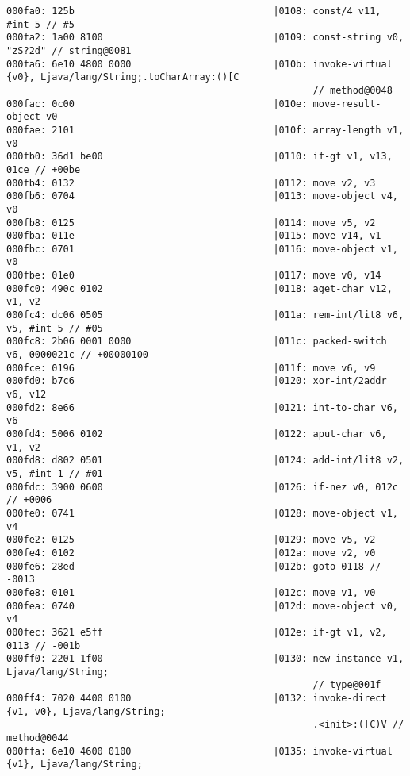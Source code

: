 \begin{lstlisting}
000fa0: 125b                                   |0108: const/4 v11, #int 5 // #5
000fa2: 1a00 8100                              |0109: const-string v0, "zS?2d" // string@0081
000fa6: 6e10 4800 0000                         |010b: invoke-virtual {v0}, Ljava/lang/String;.toCharArray:()[C
                                                      // method@0048
000fac: 0c00                                   |010e: move-result-object v0
000fae: 2101                                   |010f: array-length v1, v0
000fb0: 36d1 be00                              |0110: if-gt v1, v13, 01ce // +00be
000fb4: 0132                                   |0112: move v2, v3
000fb6: 0704                                   |0113: move-object v4, v0
000fb8: 0125                                   |0114: move v5, v2
000fba: 011e                                   |0115: move v14, v1
000fbc: 0701                                   |0116: move-object v1, v0
000fbe: 01e0                                   |0117: move v0, v14
000fc0: 490c 0102                              |0118: aget-char v12, v1, v2
000fc4: dc06 0505                              |011a: rem-int/lit8 v6, v5, #int 5 // #05
000fc8: 2b06 0001 0000                         |011c: packed-switch v6, 0000021c // +00000100
000fce: 0196                                   |011f: move v6, v9
000fd0: b7c6                                   |0120: xor-int/2addr v6, v12
000fd2: 8e66                                   |0121: int-to-char v6, v6
000fd4: 5006 0102                              |0122: aput-char v6, v1, v2
000fd8: d802 0501                              |0124: add-int/lit8 v2, v5, #int 1 // #01
000fdc: 3900 0600                              |0126: if-nez v0, 012c // +0006
000fe0: 0741                                   |0128: move-object v1, v4
000fe2: 0125                                   |0129: move v5, v2
000fe4: 0102                                   |012a: move v2, v0
000fe6: 28ed                                   |012b: goto 0118 // -0013
000fe8: 0101                                   |012c: move v1, v0
000fea: 0740                                   |012d: move-object v0, v4
000fec: 3621 e5ff                              |012e: if-gt v1, v2, 0113 // -001b
000ff0: 2201 1f00                              |0130: new-instance v1, Ljava/lang/String;
                                                      // type@001f
000ff4: 7020 4400 0100                         |0132: invoke-direct {v1, v0}, Ljava/lang/String;
                                                      .<init>:([C)V // method@0044
000ffa: 6e10 4600 0100                         |0135: invoke-virtual {v1}, Ljava/lang/String;

\end{lstlisting}
